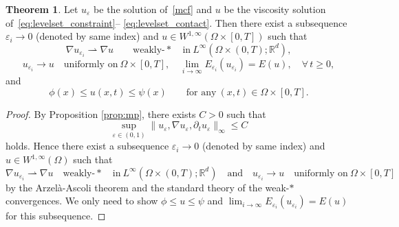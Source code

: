 \documentclass{amsart}
\theoremstyle{definition}
\newtheorem{theorem}[definition]{Theorem}
\def\R{{\mathbb{R}}}
\begin{document}
\begin{theorem}\label{thm:2.5}
Let $u_\varepsilon$ be the solution of~\eqref{mcf} and $u$ be the viscosity solution of~\eqref{eq:levelset_constraint}--
\eqref{eq:levelset_contact}. Then there exist a subsequence $\varepsilon_i \to 0$
(denoted by same index) and $u \in W^{1,\infty} (\Omega \times [0,T])$ such that
\[
\nabla u_{\varepsilon_i} \rightharpoonup \nabla u \qquad \text{weakly-}\ast \quad \text{in} \ L^\infty (\Omega \times (0,T);\R^d),
\]
\[
u_{\varepsilon _i} \to u \quad \text{uniformly on} \ \Omega\times [0,T], \quad
\lim_{i\to \infty} E_{\varepsilon_i} (u_{\varepsilon_i}) =E (u), \quad \forall\, t\geq 0,
\]
and
\[
\phi (x) \leq u(x,t) \leq \psi (x) \qquad \text{for any} \ (x,t) \in \Omega \times [0,T].
\]
\end{theorem}
\begin{proof}
By Proposition \ref{prop:mp}, there exists $C>0$ such that
\[
\sup_{\varepsilon \in (0,1)} 
\| u_\varepsilon,\nabla u_\varepsilon,\partial _t u_\varepsilon \|_\infty \leq C
\]
holds. Hence there exist a subsequence $\varepsilon_i \to 0$
(denoted by same index) and $u \in W^{1,\infty} (\Omega)$ such that
\begin{equation}\label{eq:AA}
\nabla u_{\varepsilon_i} \rightharpoonup \nabla u \quad \text{weakly-}\ast \quad \text{in} \ L^\infty (\Omega \times (0,T);\R^d) \quad \text{and} \quad
    u_{\varepsilon _i} \to u \quad \text{uniformly on} \ \Omega\times [0,T]
\end{equation}
by the Arzel\`{a}-Ascoli theorem and the standard theory of the weak-$\ast$ convergences.
We only need to show 
$\phi \leq u\leq \psi $ and $\lim_{i\to \infty} E_{\varepsilon_i} (u_{\varepsilon_i}) =E (u)$ for this subsequence.


\end{proof}
\end{document}
